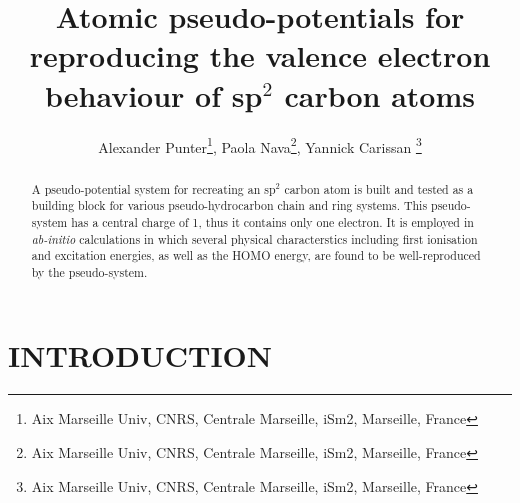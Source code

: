 \documentclass[12pt]{article}
\title{Atomic pseudo-potentials for reproducing the valence electron behaviour of sp$^2$ carbon atoms}
\author{Alexander Punter\thanks{Aix Marseille Univ, CNRS, Centrale Marseille, iSm2, Marseille, France}, Paola Nava\thanks{Aix Marseille Univ, CNRS, Centrale Marseille, iSm2, Marseille, France}, Yannick Carissan \thanks{Aix Marseille Univ, CNRS, Centrale Marseille, iSm2, Marseille, France}}
\begin{document}
\maketitle


\begin{abstract}
A pseudo-potential system for recreating an sp\(^{2}\) carbon atom is built 
and tested as a building block for various pseudo-hydrocarbon chain and ring systems.  
This pseudo-system has a central charge of 1, thus it contains only one
electron. It is employed in \textsl{ab-initio} calculations in which several physical characterstics
including first ionisation and excitation energies, as well as the HOMO energy, 
are found to be well-reproduced by the pseudo-system.
\end{abstract}

\clearpage

  \makeatletter
  \renewcommand\@biblabel[1]{#1.}
  \makeatother



\renewcommand{\baselinestretch}{1.5}
\normalsize


\clearpage

\section*{\sffamily \Large INTRODUCTION}
\end{document}
